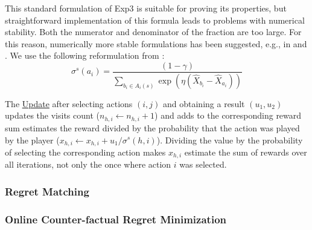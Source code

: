 This standard formulation of Exp3 is suitable for proving its properties, but straightforward implementation of this formula leads to problems with numerical stability. Both the numerator and denominator of the fraction are too large. For this reason, numerically more stable formulations has been suggested, e.g., in \cite{Lanctot13Goofspiel} and \cite{Cowling12ISMCTS}. We use the following reformulation from \cite{Cowling12ISMCTS}:
\begin{equation}
\sigma^s(a_i) = \frac{(1-\gamma)}{\sum_{b_i \in A_i(s)}\exp(\eta(\hat{X}_{b_i}-\hat{X}_{a_i}))}
\end{equation}


The \underline{Update} after selecting actions $(i,j)$ and obtaining a result $(u_1,u_2)$ updates the visits count ($n_{h,i} \leftarrow n_{h,i} + 1$) and adds to the corresponding reward sum estimates the reward divided by the probability that the action was played by the player ($x_{h,i} \leftarrow x_{h,i} + u_1/\sigma^s(h,i)$). 
Dividing the value by the probability of selecting the corresponding action makes $x_{h,i}$ estimate the sum of rewards over all iterations, not only the once where action $i$ was selected. 



\subsubsection{Regret Matching}

\subsubsection{Online Counter-factual Regret Minimization}

